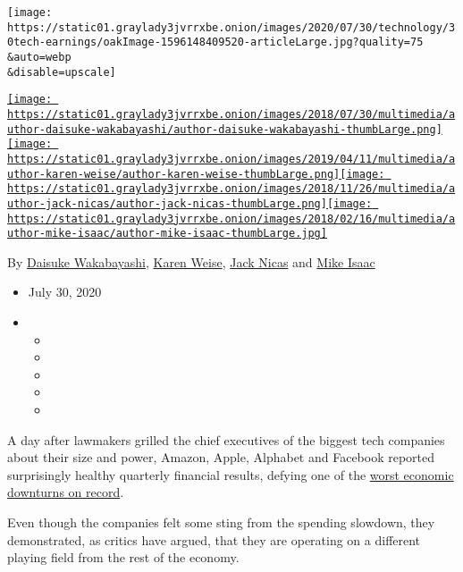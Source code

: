 \texttt{[image: https://static01.graylady3jvrrxbe.onion/images/2020/07/30/technology/30tech-earnings/oakImage-1596148409520-articleLarge.jpg?quality=75\\\&auto=webp\\\&disable=upscale]}

\href{https://www.nytimes3xbfgragh.onion/by/daisuke-wakabayashi}{\texttt{[image: https://static01.graylady3jvrrxbe.onion/images/2018/07/30/multimedia/author-daisuke-wakabayashi/author-daisuke-wakabayashi-thumbLarge.png]}}\href{https://www.nytimes3xbfgragh.onion/by/karen-weise}{\texttt{[image: https://static01.graylady3jvrrxbe.onion/images/2019/04/11/multimedia/author-karen-weise/author-karen-weise-thumbLarge.png]}}\href{https://www.nytimes3xbfgragh.onion/by/jack-nicas}{\texttt{[image: https://static01.graylady3jvrrxbe.onion/images/2018/11/26/multimedia/author-jack-nicas/author-jack-nicas-thumbLarge.png]}}\href{https://www.nytimes3xbfgragh.onion/by/mike-isaac}{\texttt{[image: https://static01.graylady3jvrrxbe.onion/images/2018/02/16/multimedia/author-mike-isaac/author-mike-isaac-thumbLarge.jpg]}}

By
\href{https://www.nytimes3xbfgragh.onion/by/daisuke-wakabayashi}{Daisuke
Wakabayashi},
\href{https://www.nytimes3xbfgragh.onion/by/karen-weise}{Karen Weise},
\href{https://www.nytimes3xbfgragh.onion/by/jack-nicas}{Jack Nicas} and
\href{https://www.nytimes3xbfgragh.onion/by/mike-isaac}{Mike Isaac}

\begin{itemize}
\item
  July 30, 2020
\item
  \begin{itemize}
  \item
  \item
  \item
  \item
  \item
  \end{itemize}
\end{itemize}

A day after lawmakers grilled the chief executives of the biggest tech
companies about their size and power, Amazon, Apple, Alphabet and
Facebook reported surprisingly healthy quarterly financial results,
defying one of the
\href{https://www.nytimes3xbfgragh.onion/live/2020/07/30/business/stock-market-today-coronavirus/the-us-economys-contraction-in-the-second-quarter-was-the-worst-on-record}{worst
economic downturns on record}.

Even though the companies felt some sting from the spending slowdown,
they demonstrated, as critics have argued, that they are operating on a
different playing field from the rest of the economy.

